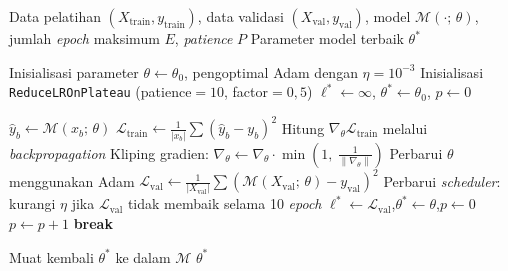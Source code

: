 \begin{algorithm}[htbp]
\caption{Pelatihan GRU/LSTM dengan \textit{Early Stopping} dan \textit{Learning Rate Scheduling}}
\label{alg:early-stopping}
\begin{algorithmic}[1]
\Require Data pelatihan $(X_{\text{train}}, y_{\text{train}})$, data validasi $(X_{\text{val}}, y_{\text{val}})$, model $\mathcal{M}(\cdot;\,\theta)$, jumlah \textit{epoch} maksimum $E$, \textit{patience} $P$
\Ensure Parameter model terbaik $\theta^*$

\State Inisialisasi parameter $\theta \gets \theta_0$, pengoptimal Adam dengan $\eta = 10^{-3}$
\State Inisialisasi \texttt{ReduceLROnPlateau} (patience$=10$, factor$=0{,}5$)
\State $\ell^* \gets \infty$, $\theta^* \gets \theta_0$, $p \gets 0$

        \State $\hat{y}_b \gets \mathcal{M}(x_b;\,\theta)$
        \State $\mathcal{L}_{\text{train}} \gets \frac{1}{|x_b|}\sum \left(\hat{y}_b - y_b\right)^2$
        \State Hitung $\nabla_\theta \mathcal{L}_{\text{train}}$ melalui \textit{backpropagation}
        \State Kliping gradien: $\nabla_\theta \gets \nabla_\theta \cdot \min\!\left(1,\ \tfrac{1}{\|\nabla_\theta\|}\right)$
        \State Perbarui $\theta$ menggunakan Adam
    \EndFor
    \State $\mathcal{L}_{\text{val}} \gets \frac{1}{|X_{\text{val}}|}\sum \left(\mathcal{M}(X_{\text{val}};\,\theta) - y_{\text{val}}\right)^2$
    \State Perbarui \textit{scheduler}: kurangi $\eta$ jika $\mathcal{L}_{\text{val}}$ tidak membaik selama 10 \textit{epoch}
        \State $\ell^* \gets \mathcal{L}_{\text{val}}$,\quad $\theta^* \gets \theta$,\quad $p \gets 0$
    \Else
        \State $p \gets p + 1$
            \State \textbf{break} 
        \EndIf
    \EndIf
\EndFor

\State Muat kembali $\theta^*$ ke dalam $\mathcal{M}$
\State \Return $\theta^*$
\end{algorithmic}
\end{algorithm}
